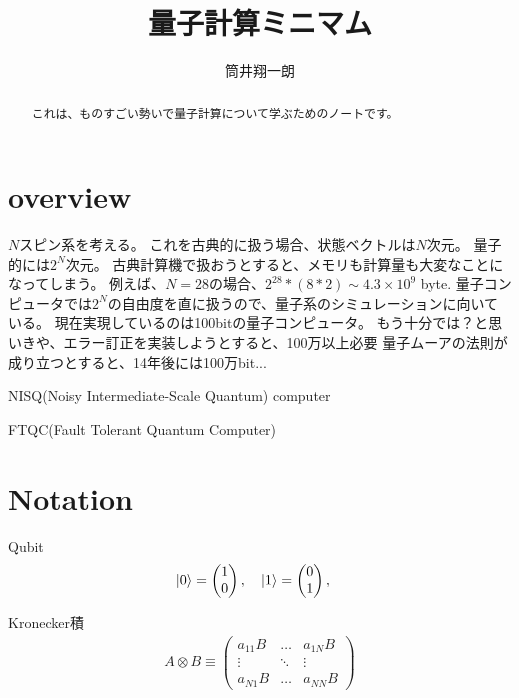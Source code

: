 \documentclass[]{ltjsarticle}
\begin{document}
\title{量子計算ミニマム}


\author{筒井翔一朗}


\maketitle
\begin{abstract}
    これは、ものすごい勢いで量子計算について学ぶためのノートです。
\end{abstract}
\tableofcontents


\section{overview}
$N$スピン系を考える。
これを古典的に扱う場合、状態ベクトルは$N$次元。
量子的には$2^N$次元。
古典計算機で扱おうとすると、メモリも計算量も大変なことになってしまう。
例えば、$N=28$の場合、$2^{28} * (8*2) \sim 4.3 \times 10^9$ byte.
量子コンピュータでは$2^N$の自由度を直に扱うので、量子系のシミュレーションに向いている。
現在実現しているのは100bitの量子コンピュータ。
もう十分では？と思いきや、エラー訂正を実装しようとすると、100万以上必要
量子ムーアの法則が成り立つとすると、14年後には100万bit...

NISQ(Noisy Intermediate-Scale Quantum) computer

FTQC(Fault Tolerant Quantum Computer) 




\section{Notation}
Qubit
\begin{align}
    \ket{0} 
    = 
    \begin{pmatrix}
    1 \\ 0    
    \end{pmatrix}, \quad 
    \ket{1} 
    = 
    \begin{pmatrix}
    0 \\ 1    
    \end{pmatrix}, \quad 
\end{align}

Kronecker積
\begin{align}
    A \otimes B 
    \equiv
    \begin{pmatrix}
        a_{11}B & \dots & a_{1N}B \\
        \vdots & \ddots & \vdots \\
        a_{N1}B & \dots & a_{NN}B
    \end{pmatrix}
\end{align}
\end{document}
